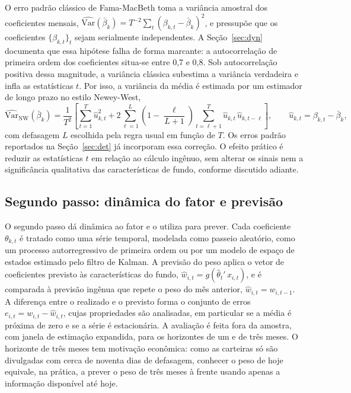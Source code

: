 \documentclass[12pt,a4paper]{article}
\begin{document}
O erro padrão clássico de Fama-MacBeth toma a variância amostral dos coeficientes mensais,
$\widehat{\mathrm{Var}}(\bar{\beta}_k)=T^{-2}\sum_t(\beta_{k,t}-\bar{\beta}_k)^2$, e pressupõe que
os coeficientes $\{\beta_{k,t}\}_t$ sejam serialmente independentes. A Seção~\ref{sec:dyn}
documenta que essa hipótese falha de forma marcante: a autocorrelação de primeira ordem dos
coeficientes situa-se entre 0,7 e 0,8. Sob autocorrelação positiva dessa magnitude, a variância
clássica subestima a variância verdadeira e infla as estatísticas $t$. Por isso, a variância da
média é estimada por um estimador de longo prazo no estilo Newey-West,
\begin{equation}
\widehat{\mathrm{Var}}_{\text{NW}}(\bar{\beta}_k) = \frac{1}{T^{2}}\!\left[
\sum_{t=1}^{T}\widehat{u}_{k,t}^{2}
+ 2\sum_{\ell=1}^{L}\!\left(1-\frac{\ell}{L+1}\right)\!\sum_{t=\ell+1}^{T}\widehat{u}_{k,t}\,\widehat{u}_{k,t-\ell}
\right], \qquad \widehat{u}_{k,t}=\beta_{k,t}-\bar{\beta}_k,
\label{eq:nw}
\end{equation}
com defasagem $L$ escolhida pela regra usual em função de $T$. Os erros padrão reportados na
Seção~\ref{sec:det} já incorporam essa correção. O efeito prático é reduzir as estatísticas $t$
em relação ao cálculo ingênuo, sem alterar os sinais nem a significância qualitativa das
características de fundo, conforme discutido adiante.

\subsection{Segundo passo: dinâmica do fator e previsão}

O segundo passo dá dinâmica ao fator e o utiliza para prever. Cada coeficiente $\theta_{k,t}$ é
tratado como uma série temporal, modelada como passeio aleatório, como um processo
autorregressivo de primeira ordem ou por um modelo de espaço de estados estimado pelo filtro de
Kalman. A previsão do peso aplica o vetor de coeficientes previsto às características do fundo,
$\widehat{w}_{i,t} = g\!\left(\widehat{\theta}_t'\,x_{i,t}\right)$, e é comparada à previsão
ingênua que repete o peso do mês anterior, $\widehat{w}_{i,t}=w_{i,t-1}$. A diferença entre o
realizado e o previsto forma o conjunto de erros $e_{i,t}=w_{i,t}-\widehat{w}_{i,t}$, cujas
propriedades são analisadas, em particular se a média é próxima de zero e se a série é
estacionária. A avaliação é feita fora da amostra, com janela de estimação expandida, para os
horizontes de um e de três meses. O horizonte de três meses tem motivação econômica: como as
carteiras só são divulgadas com cerca de noventa dias de defasagem, conhecer o peso de hoje
equivale, na prática, a prever o peso de três meses à frente usando apenas a informação
disponível até hoje.
\end{document}
